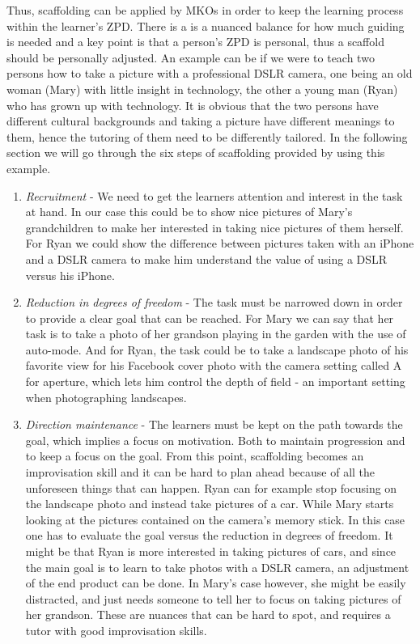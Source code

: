 Thus, scaffolding can be applied by MKOs in order to keep the learning process within the learner’s ZPD. There is a is a nuanced balance for how much guiding is needed and a key point is that a person's ZPD is personal, thus a scaffold should be personally adjusted. An example can be if we were to teach two persons how to take a picture with a professional DSLR camera, one being an old woman (Mary) with little insight in technology, the other a young man (Ryan) who has grown up with technology. It is obvious that the two persons have different cultural backgrounds and taking a picture have different meanings to them, hence the tutoring of them need to be differently tailored. In the following section we will go through the six steps of scaffolding provided by \citet{wood1976role} using this example.

\begin{enumerate}
\item{} \emph{Recruitment} - We need to get the learners attention and interest in the task at hand. In our case this could be to show nice pictures of Mary's grandchildren to make her interested in taking nice pictures of them herself. For Ryan we could show the difference between pictures taken with an iPhone and a DSLR camera to make him understand the value of using a DSLR versus his iPhone.

\item{} \emph{Reduction in degrees of freedom} - The task must be narrowed down in order to provide a clear goal that can be reached. For Mary we can say that her task is to take a photo of her grandson playing in the garden with the use of auto-mode. And for Ryan, the task could be to take a landscape photo of his favorite view for his Facebook cover photo with the camera setting called A for aperture, which lets him control the depth of field - an important setting when photographing landscapes. 

\item{} \emph{Direction maintenance} - The learners must be kept on the path towards the goal, which implies a focus on motivation. Both to maintain progression and to keep a focus on the goal. From this point, scaffolding becomes an improvisation skill and it can be hard to plan ahead because of all the unforeseen things that can happen. Ryan can for example stop focusing on the landscape photo and instead take pictures of a car. While Mary starts looking at the pictures contained on the camera's memory stick. In this case one has to evaluate the goal versus the reduction in degrees of freedom. It might be that Ryan is more interested in taking pictures of cars, and since the main goal is to learn to take photos with a DSLR camera, an adjustment of the end product can be done. In Mary's case however, she might be easily distracted, and just needs someone to tell her to focus on taking pictures of her grandson. These are nuances that can be hard to spot, and requires a tutor with good improvisation skills.


\end{enumerate}
